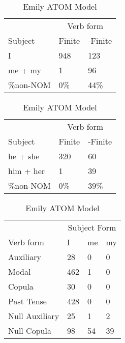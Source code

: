 \begin{table}[]
\caption{Emily ATOM Model}
\begin{minipage}{0.5\textwidth}
    \centering
    \begin{tabular}{@{}lll@{}}
        \toprule
         & \multicolumn{2}{c}{Verb form}\\
         \cline{2-3}
        Subject & Finite & -Finite \\
        \midrule
        I & 948 & 123 \\
        me + my & 1 & 96 \\
        \hline
        \%non-NOM & 0\% & 44\% \\
        \bottomrule
    \end{tabular}
\end{minipage}
\begin{minipage}{0.5\textwidth}
    \centering
    \begin{tabular}{@{}lll@{}}
        \toprule
         & \multicolumn{2}{c}{Verb form}\\
         \cline{2-3}
        Subject & Finite & -Finite \\
        \midrule
        he + she & 320 & 60 \\
        him + her & 1 & 39 \\
        \hline
        \%non-NOM & 0\% & 39\% \\
        \bottomrule
    \end{tabular}
    \end{minipage}
    \begin{minipage}{0.5\textwidth}
    \centering
    \begin{tabular}{@{}llll@{}}
        \toprule
            &\multicolumn{3}{c}{Subject Form}\\
            \cline{2-4}
        Verb form & I & me & my \\
        \midrule
        Auxiliary & 28 & 0 & 0 \\
        Modal & 462 & 1 & 0 \\
        Copula & 30 & 0 & 0 \\
        Past Tense & 428 & 0 & 0 \\
        \hline
        Null Auxiliary & 25 & 1 & 2 \\
        Null Copula & 98 & 54 & 39 \\
        \bottomrule
    \end{tabular}

\end{minipage}
\end{table}
